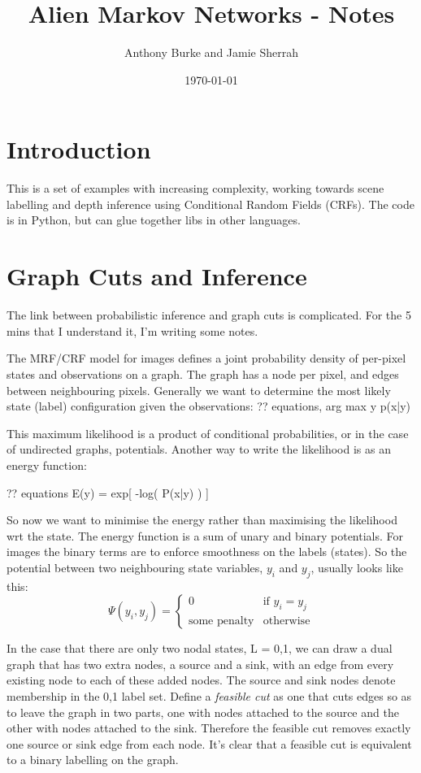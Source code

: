 \documentclass{article}
\title{Alien Markov Networks - Notes}
\author{ Anthony Burke and Jamie Sherrah}
\date{\today}
\begin{document}
\maketitle

\section{Introduction}

This is a set of examples with increasing complexity, working towards scene
labelling and depth inference using Conditional Random Fields (CRFs).  The code
is in Python, but can glue together libs in other languages.

\section{Graph Cuts and Inference}

The link between probabilistic inference and graph cuts is complicated.  For the
5 mins that I understand it, I'm writing some notes.

The MRF/CRF model for images defines a joint probability density of per-pixel
states and observations on a graph.  The graph has a node per pixel, and edges
between neighbouring pixels.  Generally we want to determine the most likely
state (label) configuration given the observations:
?? equations, arg max y p(x|y)

This maximum likelihood is a product of conditional probabilities, or in the
case of undirected graphs, potentials.  Another way to write the likelihood
is as an energy function:

?? equations E(y) = exp[ -log( P(x|y) ) ]

So now we want to minimise the energy rather than maximising the likelihood wrt
the state.  The energy function is a sum of unary and binary potentials.  For
images the binary terms are to enforce smoothness on the labels (states).  So
the potential between two neighbouring state variables, $y_i$ and $y_j$, usually
looks like this:
\begin{equation}
\Psi(y_i,y_j) = \left\{ \begin{array}{ll}
0 & \mbox{if } y_i=y_j \\
\mbox{some penalty} &  \mbox{otherwise}
\end{array}\right.
\end{equation}

In the case that there are only two nodal states, L = {0,1}, we can draw a dual
graph that has two extra nodes, a source and a sink, with an edge from every
existing node to each of these added nodes.  The source and sink nodes denote
membership in the 0,1 label set.  Define a {\em feasible cut} as one that cuts
edges so as to leave the graph in two parts, one with nodes attached to the
source and the other with nodes attached to the sink.  Therefore the feasible
cut removes exactly one source or sink edge from each node.  It's clear that 
a feasible cut is equivalent to a binary labelling on the graph.
\end{document}
